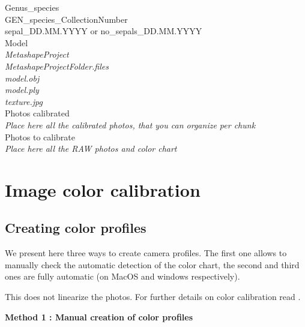 \documentclass[
]{book}
\theoremstyle{definition}
\theoremstyle{definition}
\theoremstyle{definition}
\theoremstyle{definition}
\theoremstyle{remark}
\begin{document}
Genus\_species\\
GEN\_species\_CollectionNumber\\
sepal\_DD.MM.YYYY or no\_sepals\_DD.MM.YYYY\\
Model\\
\emph{MetashapeProject}\\
\emph{MetashapeProjectFolder.files}\\
\emph{model.obj}\\
\emph{model.ply}\\
\emph{texture.jpg}\\
Photos calibrated\\
\emph{Place here all the calibrated photos, that you can organize per chunk}\\
Photos to calibrate\\
\emph{Place here all the RAW photos and color chart}\\

\hypertarget{image-color-calibration}{%
\section{Image color calibration}\label{image-color-calibration}}

\hypertarget{creating-color-profiles}{%
\subsection{Creating color profiles}\label{creating-color-profiles}}

We present here three ways to create camera profiles. The first one
allows to manually check the automatic detection of the color chart, the
second and third ones are fully automatic (on MacOS and windows
respectively).

This does not linearize the photos. For further details on color
calibration read \citep{troscianko2015image}.

\textbf{Method 1 : Manual creation of color profiles}
\end{document}
